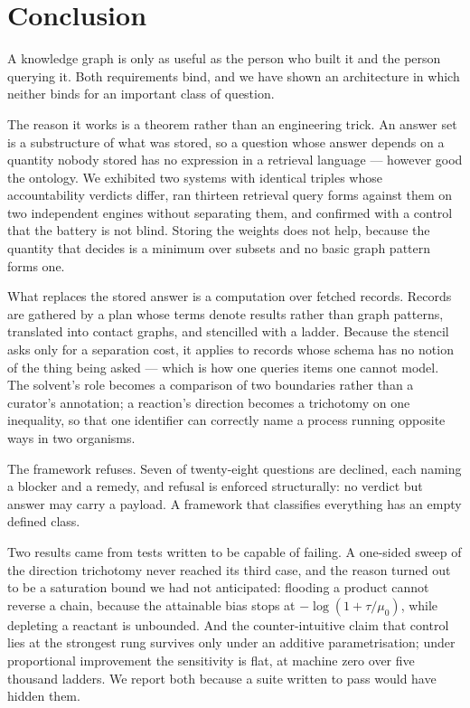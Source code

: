 \documentclass[11pt,twocolumn,a4paper]{article}
\theoremstyle{thmstyle}
\theoremstyle{definition}
\theoremstyle{remark}
\newcommand{\vans}{\textsf{answer}}
\begin{document}
\section{Conclusion}
\label{sec:conclusion}

A knowledge graph is only as useful as the person who built it and the person
querying it. Both requirements bind, and we have shown an architecture in
which neither binds for an important class of question.

The reason it works is a theorem rather than an engineering trick. An answer
set is a substructure of what was stored, so a question whose answer depends
on a quantity nobody stored has no expression in a retrieval language ---
however good the ontology. We exhibited two systems with identical triples
whose accountability verdicts differ, ran thirteen retrieval query forms
against them on two independent engines without separating them, and confirmed
with a control that the battery is not blind. Storing the weights does not
help, because the quantity that decides is a minimum over subsets and no basic
graph pattern forms one.

What replaces the stored answer is a computation over fetched records. Records
are gathered by a plan whose terms denote results rather than graph patterns,
translated into contact graphs, and stencilled with a ladder. Because the
stencil asks only for a separation cost, it applies to records whose schema
has no notion of the thing being asked --- which is how one queries items one
cannot model. The solvent's role becomes a comparison of two boundaries rather
than a curator's annotation; a reaction's direction becomes a trichotomy on
one inequality, so that one identifier can correctly name a process running
opposite ways in two organisms.

The framework refuses. Seven of twenty-eight questions are declined, each
naming a blocker and a remedy, and refusal is enforced structurally: no
verdict but \vans{} may carry a payload. A framework that classifies
everything has an empty defined class.

Two results came from tests written to be capable of failing. A one-sided
sweep of the direction trichotomy never reached its third case, and the reason
turned out to be a saturation bound we had not anticipated: flooding a product
cannot reverse a chain, because the attainable bias stops at
$-\log(1+\tau/\mu_0)$, while depleting a reactant is unbounded. And the
counter-intuitive claim that control lies at the strongest rung survives only
under an additive parametrisation; under proportional improvement the
sensitivity is flat, at machine zero over five thousand ladders. We report
both because a suite written to pass would have hidden them.
\end{document}
